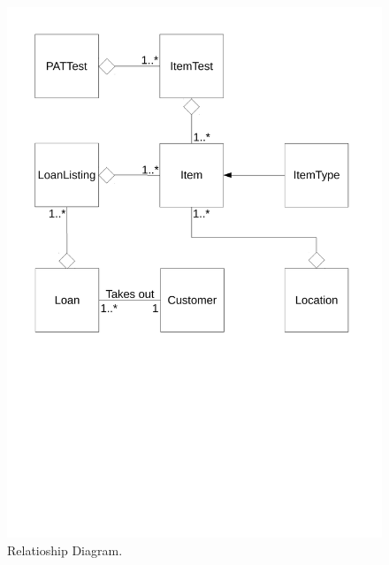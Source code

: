 \begin{figure}[H]
    \includegraphics[width=\textwidth]{./Analysis/Relationship_Diagrams/Relationships_diagrams.pdf}
    \caption{Relatioship Diagram.} \label{fig:relationship_diagram}
\end{figure}

\newpage

